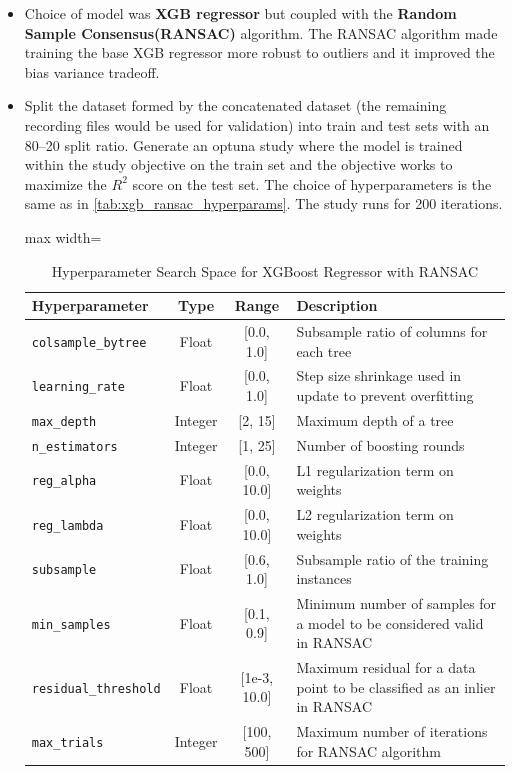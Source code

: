 \documentclass{iutbscthesis}
\begin{document}
\begin{itemize}
    \item Choice of model was \textbf{XGB regressor} but coupled with the \textbf{Random Sample Consensus(RANSAC)}\cite{fischler1981random} algorithm. The RANSAC algorithm made training the base XGB regressor more robust to outliers and it improved the bias variance tradeoff.
    
    \item Split the dataset formed by the concatenated dataset (the remaining recording files would be used for validation) into train and test sets with an 80--20 split ratio. Generate an optuna study\cite{akiba2019optuna} where the model is trained 
    within the study objective on the train set and the objective works to maximize the $R^2$ score on the test set. The choice of hyperparameters is the same as in \autoref{tab:xgb_ransac_hyperparams}. The study runs for 200 iterations.
    \begin{table}[H]
    \centering
    \caption{Hyperparameter Search Space for XGBoost Regressor with RANSAC}
    \label{tab:xgb_ransac_hyperparams}

        \begin{adjustbox}{max width=\textwidth}
            \begin{tabular}{|l|c|c|p{}|}
                \hline
                \textbf{Hyperparameter} & \textbf{Type} & \textbf{Range} & \textbf{Description} \\
                \hline
                \texttt{colsample\_bytree} & Float & [0.0, 1.0] & Subsample ratio of columns for each tree \\
                \texttt{learning\_rate} & Float & [0.0, 1.0] & Step size shrinkage used in update to prevent overfitting \\
                \texttt{max\_depth} & Integer & [2, 15] & Maximum depth of a tree \\
                \texttt{n\_estimators} & Integer & [1, 25] & Number of boosting rounds \\
                \texttt{reg\_alpha} & Float & [0.0, 10.0] & L1 regularization term on weights \\
                \texttt{reg\_lambda} & Float & [0.0, 10.0] & L2 regularization term on weights \\
                \hline
                \texttt{subsample} & Float & [0.6, 1.0] & Subsample ratio of the training instances \\
                \texttt{min\_samples} & Float & [0.1, 0.9] & Minimum number of samples for a model to be considered valid in RANSAC \\
                \texttt{residual\_threshold} & Float & [1e-3, 10.0] & Maximum residual for a data point to be classified as an inlier in RANSAC \\
                \texttt{max\_trials} & Integer & [100, 500] & Maximum number of iterations for RANSAC algorithm \\
                \hline
            \end{tabular}          
        \end{adjustbox}
    \end{table}
    


\end{itemize}
\end{document}
